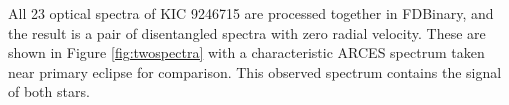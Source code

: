 All 23 optical spectra of KIC 9246715 are processed together in FDBinary, and the result is a pair of disentangled spectra with zero radial velocity. These are shown in Figure \ref{fig:twospectra} with a characteristic ARCES spectrum taken near primary eclipse for comparison. This observed spectrum contains the signal of both stars.

